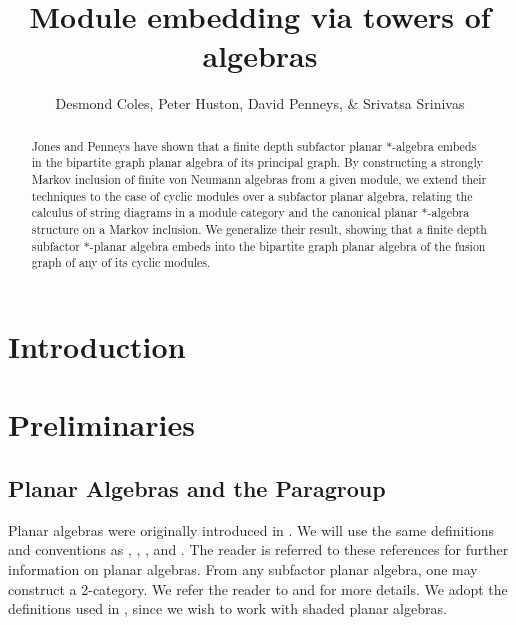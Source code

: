 \documentclass[11pt]{article}
\title{Module embedding via towers of algebras}
\author{Desmond Coles, Peter Huston, David Penneys, \& Srivatsa Srinivas}
\theoremstyle{plain}
\theoremstyle{definition}
\begin{document}

\maketitle
\begin{abstract}
Jones and Penneys have shown that a finite depth subfactor planar $*$-algebra embeds in the bipartite graph planar algebra of its principal graph. By constructing a strongly Markov inclusion of finite von Neumann algebras from a given module, we extend their techniques to the case of cyclic modules over a subfactor planar algebra, relating the calculus of string diagrams in a module category and the canonical planar $*$-algebra structure on a Markov inclusion. We generalize their result, showing that a finite depth subfactor $*$-planar algebra embeds into the bipartite graph planar algebra of the fusion graph of any of its cyclic modules. 
\end{abstract}
\section{Introduction}
\section{Preliminaries}
\subsection{Planar Algebras and the Paragroup}
Planar algebras were originally introduced in \cite{planaralg1}. We will use the same definitions and conventions as \cite{penneys}, \cite{peters}, \cite{jones}, and \cite{planaralg2}. The reader is referred to these references for further information on planar algebras. From any subfactor planar algebra, one may construct a 2-category. We refer the reader to \cite{paragroup} and \cite{paragroup2} for more details. We adopt the definitions used in \cite{paragroup}, since we wish to work with shaded planar algebras.
\end{document}
